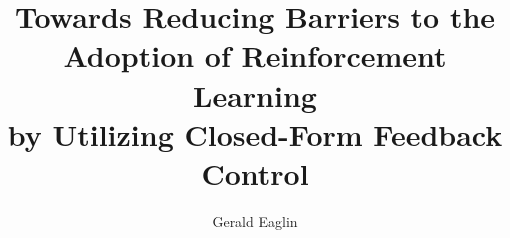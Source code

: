 \documentclass[12pt,normalmargins]{gatech-thesis}
\title{Towards Reducing Barriers to the Adoption of Reinforcement Learning \\ by Utilizing Closed-Form Feedback Control}
\author{Gerald Eaglin}
\begin{document}
\iraggedright


\begin{preliminary}













\contents
\end{preliminary}























\begin{postliminary}

\end{postliminary}






\end{document}
